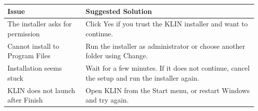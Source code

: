 \documentclass[12pt,oneside,openright,a4paper]{cpe-english-project}
\begin{document}
\begin{longtable}{|p{}|p{}|}
\hline
\textbf{Issue} & \textbf{Suggested Solution} \\
\hline
The installer asks for permission & Click Yes if you trust the KLIN installer and want to continue. \\
\hline
Cannot install to Program Files & Run the installer as administrator or choose another folder using Change. \\
\hline
Installation seems stuck & Wait for a few minutes. If it does not continue, cancel the setup and run the installer again. \\
\hline
KLIN does not launch after Finish & Open KLIN from the Start menu, or restart Windows and try again. \\
\hline
\end{longtable}
\end{document}
